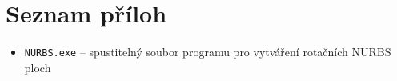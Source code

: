 \chapter*{Seznam příloh}
\begin{itemize}
	\item \verb|NURBS.exe| -- spustitelný soubor programu pro vytváření rotačních NURBS ploch
\end{itemize}
